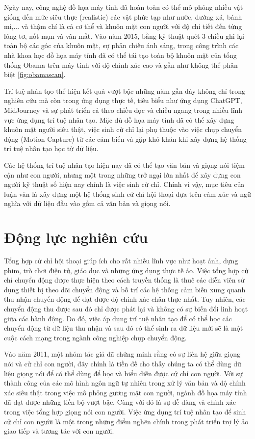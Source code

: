Ngày nay, công nghệ đồ họa máy tính đã hoàn toàn có thể mô phỏng nhiều vật giống đến mức siêu thực (realistic) các vật phức tạp như nước, đường xá, bánh mì,...  và thậm chí là cả cơ thể và khuôn mặt con người với độ chi tiết đến từng lông tơ, nốt mụn và vân mắt. 
Vào năm 2015, bằng kỹ thuật quét 3 chiều ghi lại toàn bộ các góc của khuôn mặt, sự phản chiếu ánh sáng, trong công trình \cite{metallo2015scanning}
các nhà khoa học đồ họa máy tính đã có thể tái tạo toàn bộ khuôn mặt của tổng thống Obama trên máy tính với độ chính xác cao và gần như không thể phân biệt \autoref{fig:obamascan}.

Trí tuệ nhân tạo thể hiện kết quả vượt bậc những năm gần đây không chỉ trong nghiên cứu mà còn trong ứng dụng thực tế, tiêu biểu như ứng dụng ChatGPT, MidJourney và sự phát triển cả theo chiều dọc và chiều ngang trong nhiều lĩnh vực ứng dụng trí tuệ nhân tạo. Mặc dù đồ họa máy tính đã có thể xây dựng khuôn mặt người siêu thật, việc sinh cử chỉ lại phụ thuộc vào việc chụp chuyển động (Motion Capture) từ các cảm biến và gặp khó khăn khi xây dựng hệ thống trí tuệ nhân tạo học từ dữ liệu.

Các hệ thống trí tuệ nhân tạo hiện nay đã có thể tạo văn bản và giọng nói tiệm cận như con người, nhưng một trong những trở ngại lớn nhất để xây dựng con người kỹ thuật số hiện nay chính là việc sinh cử chỉ. Chính vì vậy, mục tiêu của luận văn là xây dựng một hệ thống sinh cử chỉ hội thoại dựa trên cảm xúc và ngữ nghĩa với dữ liệu đầu vào gồm cả văn bản và giọng nói.

\section{Động lực nghiên cứu}

Tổng hợp cử chỉ hội thoại giúp ích cho rất nhiều lĩnh vực như hoạt ảnh, dựng phim, trò chơi điện tử, giáo dục và những ứng dụng thực tế ảo. Việc tổng hợp cử chỉ chuyển động được thực hiện theo cách truyền thống là thuê các diễn viên sử dụng thiết bị theo dõi chuyển động và bố trí các hệ thống cảm biến xung quanh thu nhận chuyển động để đạt được độ chính xác chân thực nhất. Tuy nhiên, các chuyển động thu được sau đó chỉ được phát lại và không có sự biến đổi linh hoạt giữa các hành động. Do đó, việc áp dụng trí tuệ nhân tạo để có thể học các chuyển động từ dữ liệu thu nhận và sau đó có thể sinh ra dữ liệu mới sẽ là một cuộc cách mạng trong ngành công nghiệp chụp chuyển động.

Vào năm 2011, một nhóm tác giả \cite{bergmann2011relation} đã chứng minh rằng có sự liên hệ giữa giọng nói và cử chỉ con người, đây chính là tiền đề cho thấy chúng ta có thể dùng dữ liệu giọng nói để có thể dùng để học và biểu diễn được cử chỉ con người.
Với sự thành công của các mô hình ngôn ngữ tự nhiên trong xử lý văn bản và độ chính xác siêu thật trong việc mô phỏng gương mặt con người, ngành đồ họa máy tính đã đạt được những tiến bộ vượt bậc. Cùng với đó là sự dễ dàng và chính xác trong việc tổng hợp giọng nói con người.
Việc ứng dụng trí tuệ nhân tạo để sinh cử chỉ con người là một trong những điểm nghẽn chính trong phát triển trợ lý ảo giao tiếp và tương tác với con người.

